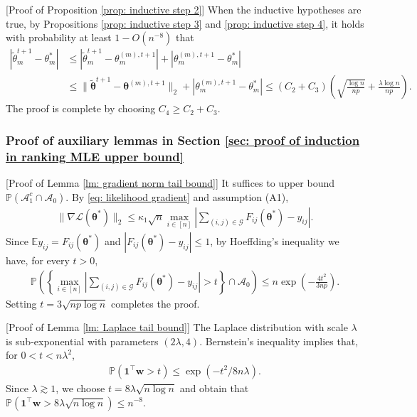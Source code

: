 \documentclass[letterpaper,12pt]{article}
\numberwithin{equation}{section}
\theoremstyle{plain}
\numberwithin{Theorem}{section}
\numberwithin{corollary}{section}
\numberwithin{proposition}{section}
\numberwithin{Lemma}{section}
{
	\theoremstyle{definition}
	\newtheorem{Definition}{Definition}
	\newtheorem{example}{Example}
	\numberwithin{example}{section}
	\newtheorem{fact}{Fact}
	\numberwithin{fact}{section}
	\newtheorem{remark}{Remark}
}
\newcommand{\Pro}{\mathbb{P}}
\newcommand{\1}{\mathbbm{1}}
\def\bth{{\boldsymbol{\theta}}}
\def\E{\mathbb{E}}
\begin{document}
[Proof of Proposition \ref{prop: inductive step 2}]
	When the inductive hypotheses are true, by Propositions \ref{prop: inductive step 3} and \ref{prop: inductive step 4}, it holds with probability at least $1 - O(n^{-8})$ that
	\begin{align*}
		|\widetilde\theta^{t+1}_m - \theta^*_m| &\leq |\widetilde\theta^{t+1}_m - \theta^{(m), t+1}_m| + |\theta^{(m), t+1}_m - \theta^*_m|\\
		&\leq \|\widetilde\bth^{t+1} - \bth^{(m), t+1}\|_2 + |\theta^{(m), t+1}_m - \theta^*_m| \leq (C_2 + C_3) \left(\sqrt{\frac{\log n}{np}} + \frac{\lambda\log n}{np}\right). 
	\end{align*}
	The proof is complete by choosing $C_4 \geq C_2 + C_3$.



\subsubsection{Proof of auxiliary lemmas in Section \ref{sec: proof of induction in ranking MLE upper bound}} \label{sec: proof of ranking upper bound lemmas}
[Proof of Lemma \ref{lm: gradient norm tail bound}]
	It suffices to upper bound $\Pro(\mathcal A_1^c \cap \mathcal A_0)$. By \eqref{eq: likelihood gradient} and assumption (A1),
	\begin{align*}
		\|\nabla \mathcal L(\bth^*)\|_2 \leq \kappa_1\sqrt{n} \max_{i \in [n]} \left|\sum_{(i, j) \in \mathcal G} F_{ij}(\bth^*) - y_{ij}\right|.
	\end{align*}
	Since $\E y_{ij} = F_{ij}(\bth^*)$ and $|F_{ij}(\bth^*) - y_{ij}| \leq 1$, by Hoeffding's inequality we have, for every $t > 0$,
	\begin{align*}
		\Pro\left(\left\{\max_{i \in [n]} \left|\sum_{(i, j) \in \mathcal G} F_{ij}(\bth^*) - y_{ij}\right| > t \right\} \cap \mathcal A_0\right) \leq n\exp\left(-\frac{4t^2}{3np}\right).
	\end{align*}
	Setting $t = 3\sqrt{np\log n}$ completes the proof.


[Proof of Lemma \ref{lm: Laplace tail bound}]
	The Laplace distribution with scale $\lambda$ is sub-exponential with parameters $(2\lambda, 4)$. Bernstein's inequality implies that, for $0 < t < n\lambda^2$, 
	\begin{align*}
		\Pro(\bm 1^\top \bm w > t) \leq \exp(-t^2/8n\lambda).
	\end{align*}
	Since $\lambda \gtrsim 1$, we choose $t = 8\lambda\sqrt{n\log n}$ and obtain that $\Pro(\bm 1^\top \bm w > 8\lambda\sqrt{n\log n}) \leq n^{-8}$.
	
\end{document}
